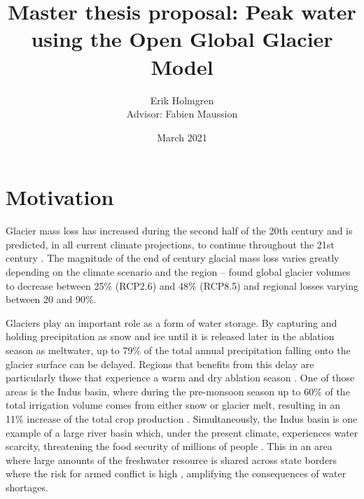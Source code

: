 \documentclass[12pt, a4paper]{article}
\author{Erik Holmgren \\ Advisor: Fabien Maussion}
\title{Master thesis proposal: Peak water using the Open Global Glacier Model}
\date{March 2021}
\begin{document}
\maketitle
\noindent
\section{Motivation}
Glacier mass loss has increased during the second half of the 20th century
\parencite{vaughanObservationsCryosphere2013} and is predicted, in all current
climate projections, to continue throughout the 21st century
\parencite{ipccClimateChange20142014}. The magnitude of the end of century
glacial mass loss varies greatly depending on the climate scenario and the
region -- \textcite{hussNewModelGlobal2015} found global glacier volumes to
decrease between 25\% (RCP2.6) and 48\% (RCP8.5) and regional losses varying
between 20 and 90\%.




Glaciers play an important role as a form of water storage. By capturing and
holding precipitation as snow and ice until it is released later in the ablation
season as meltwater, up to 79\% of the total annual precipitation falling onto
the glacier surface can be delayed. Regions that benefits from this delay are
particularly those that experience a warm and dry ablation season
\parencite{kaserContributionPotentialGlaciers2010}. One of those areas is the
Indus basin, where during the pre-monsoon season up to 60\% of the total
irrigation volume comes from either snow or glacier melt, resulting in an 11\%
increase of the total crop production
\parencite{biemansImportanceSnowGlacier2019}. Simultaneously, the Indus basin is
one example of a large river basin which, under the present climate, experiences
water scarcity, threatening the food security of millions of people
\parencite{kummuClimatedrivenInterannualVariability2014}. This in an area where
large amounts of the freshwater resource is shared across state borders where
the risk for armed conflict is high
\parencite{schleussnerArmedconflictRisksEnhanced2016,
pritchardAsiaShrinkingGlaciers2019}, amplifying the consequences of water
shortages. 
\end{document}
